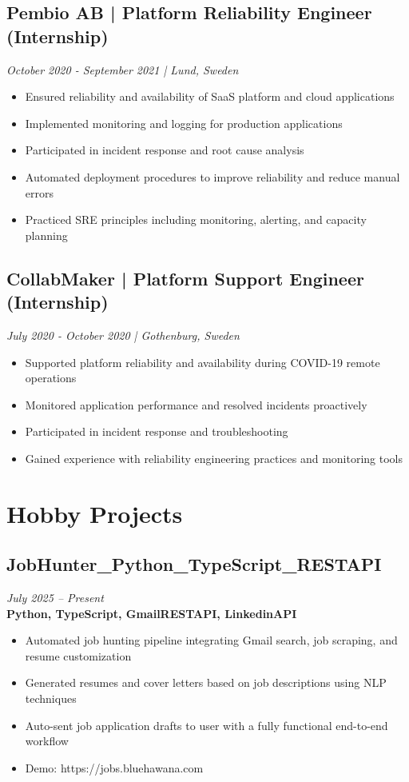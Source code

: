 \documentclass[11pt,a4paper]{article}
\begin{document}
\subsection*{Pembio AB | Platform Reliability Engineer (Internship)}
\textit{October 2020 - September 2021 | Lund, Sweden}
\begin{itemize}[noitemsep]
\item Ensured reliability and availability of SaaS platform and cloud applications
\item Implemented monitoring and logging for production applications
\item Participated in incident response and root cause analysis
\item Automated deployment procedures to improve reliability and reduce manual errors
\item Practiced SRE principles including monitoring, alerting, and capacity planning
\end{itemize}

\subsection*{CollabMaker | Platform Support Engineer (Internship)}
\textit{July 2020 - October 2020 | Gothenburg, Sweden}
\begin{itemize}[noitemsep]
\item Supported platform reliability and availability during COVID-19 remote operations
\item Monitored application performance and resolved incidents proactively
\item Participated in incident response and troubleshooting
\item Gained experience with reliability engineering practices and monitoring tools
\end{itemize}

\section*{Hobby Projects}
\subsection{JobHunter\_Python\_TypeScript\_RESTAPI}
\textit{July 2025 -- Present} \\
\textbf{Python, TypeScript, GmailRESTAPI, LinkedinAPI}
\begin{itemize}
\item Automated job hunting pipeline integrating Gmail search, job scraping, and resume customization
\item Generated resumes and cover letters based on job descriptions using NLP techniques
\item Auto-sent job application drafts to user with a fully functional end-to-end workflow
\item Demo: https://jobs.bluehawana.com
\end{itemize}
\end{document}
